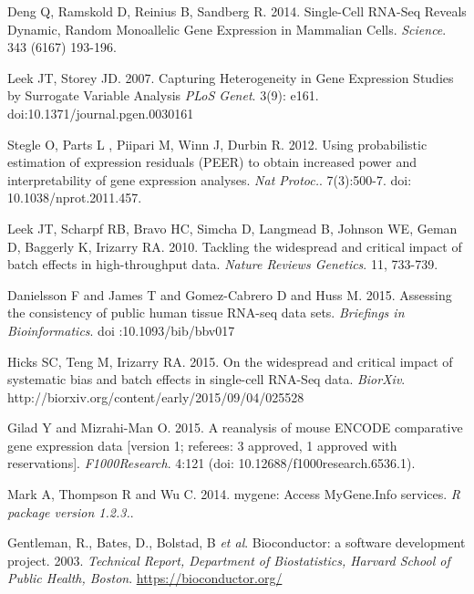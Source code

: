 \documentclass[10pt,letterpaper]{article}
\begin{document}
\begin{thebibliography}{9}
Deng Q,  Ramskold D,  Reinius B,  Sandberg R. 2014.
Single-Cell RNA-Seq Reveals Dynamic, Random Monoallelic Gene Expression in Mammalian Cells.
\textit{Science}.  343 (6167) 193-196.


Leek JT,  Storey JD. 2007.
Capturing Heterogeneity in Gene Expression Studies by Surrogate Variable Analysis
\textit{PLoS Genet}. 3(9): e161. doi:10.1371/journal.pgen.0030161

Stegle O,  Parts L ,  Piipari M,  Winn J,  Durbin R. 2012.
Using probabilistic estimation of expression residuals (PEER) to obtain increased power and interpretability of gene expression analyses.
\textit{Nat Protoc.}. 7(3):500-7. doi: 10.1038/nprot.2011.457.


Leek JT,  Scharpf RB,  Bravo HC,  Simcha D,  Langmead B,  Johnson WE,  Geman D,  Baggerly K,  Irizarry RA. 2010.
Tackling the widespread and critical impact of batch effects in high-throughput data.
\textit{Nature Reviews Genetics}. 11, 733-739.

Danielsson F and James T and Gomez-Cabrero D and Huss  M. 2015.
Assessing the consistency of public human tissue RNA-seq data sets.
\textit{Briefings in Bioinformatics}.  doi :10.1093/bib/bbv017


Hicks SC, Teng M, Irizarry RA. 2015.
On the widespread and critical impact of systematic bias and batch effects in single-cell RNA-Seq data.
\textit{BiorXiv}. http://biorxiv.org/content/early/2015/09/04/025528

Gilad Y and Mizrahi-Man O. 2015.
A reanalysis of mouse ENCODE comparative gene expression data [version 1; referees: 3 approved, 1 approved with reservations].
\textit{F1000Research}. 4:121 (doi: 10.12688/f1000research.6536.1).



Mark A, Thompson R and Wu C.  2014.
mygene: Access MyGene.Info services.
\textit{R package version 1.2.3.}.

Gentleman, R., Bates, D., Bolstad, B \textit{et al}.
 Bioconductor: a software development project. 2003.
 \textit{Technical Report, Department of Biostatistics, Harvard
School of Public Health, Boston}. \url{https://bioconductor.org/}


\end{thebibliography}
\end{document}

